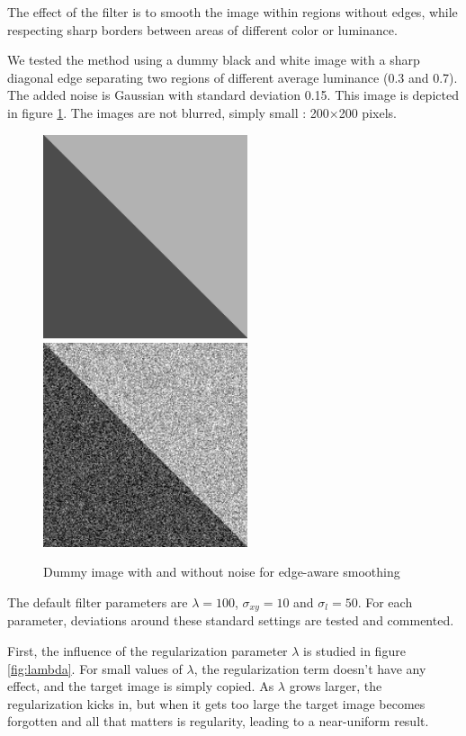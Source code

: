 \documentclass{article}
\begin{document}
The effect of the filter is to smooth the image within regions without edges, while respecting sharp borders between areas of different color or luminance.

\medskip

We tested the method using a dummy black and white image with a sharp diagonal edge separating two regions of different average luminance (0.3 and 0.7). The added noise is Gaussian with standard deviation 0.15. This image is depicted in figure \ref{fig:dummy}. The images are not blurred, simply small : 200$\times$200 pixels.

\begin{figure}
    \centering
    \includegraphics[width=6cm]{../code/results/reference.png}
    \hspace{1cm}
    \includegraphics[width=6cm]{../code/results/noisy_reference.png}
    \caption{Dummy image with and without noise for edge-aware smoothing}
    \label{fig:dummy}
\end{figure}

The default filter parameters are $\lambda = 100$, $\sigma_{xy} = 10$ and $\sigma_l = 50$. For each parameter, deviations around these standard settings are tested and commented.

\medskip

First, the influence of the regularization parameter $\lambda$ is studied in figure \ref{fig:lambda}. For small values of $\lambda$, the regularization term doesn't have any effect, and the target image is simply copied. As $\lambda$ grows larger, the regularization kicks in, but when it gets too large the target image becomes forgotten and all that matters is regularity, leading to a near-uniform result.
\end{document}
